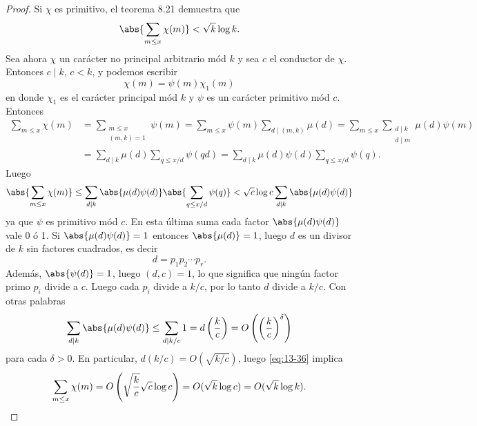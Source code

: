 \documentclass[12pt,a4paper]{book}
\begin{document}
    \begin{proof}
        Si $\chi$ es primitivo, el teorema 8.21 demuestra que
        \begin{equation*}
            \abs{\sum_{m\leq x}\chi(m)}<\sqrt{k}\log k.
        \end{equation*}
        Sea ahora $\chi$ un carácter no principal arbitrario mód $k$ y sea $c$ el conductor de
        $\chi$. Entonces $c\mid k$, $c<k$, y podemos escribir
        \begin{equation*}
            \chi(m)=\psi(m)\chi_{1}(m)
        \end{equation*}
        en donde $\chi_{1}$ es el carácter principal mód $k$ y $\psi$ es un carácter primitivo
        mód $c$. Entonces
        \begin{align*}
            \sum_{m\leq x}\chi(m)&=\sum_{\substack{m\leq x\\(m,k)=1}}\psi(m)=\sum_{m\leq x}\psi(m)\sum_{d\mid(m,k)}\mu(d)=\sum_{m\leq x}\sum_{\substack{d\mid k\\d\mid m}}\mu(d)\psi(m)\\
            &=\sum_{d\mid k}\mu(d)\sum_{q\leq x/d}\psi(qd)=\sum_{d\mid k}\mu(d)\psi(d)\sum_{q\leq x/d}\psi(q).
        \end{align*}
        Luego
        \begin{equation}\label{eq:13-36}
            \abs{\sum_{m\leq x}\chi(m)}\leq\sum_{d\mid k}\abs{\mu(d)\psi(d)}\abs{\sum_{q\leq x/d}\psi(q)}<\sqrt{c}\log c\sum_{d\mid k}\abs{\mu(d)\psi(d)}
        \end{equation}
        ya que $\psi$ es primitivo mód $c$. En esta última suma cada factor
        $\abs{\mu(d)\psi(d)}$ vale 0 ó 1. Si $\abs{\mu(d)\psi(d)}=1$ entonces $\abs{\mu(d)}=1$,
        luego $d$ es un divisor de $k$ sin factores cuadrados, es decir
        \begin{equation*}
            d=p_{1}p_{2}\cdots p_{r}.
        \end{equation*}
        Además, $\abs{\psi(d)}=1$, luego $(d,c)=1$, lo que significa que ningún factor primo
        $p_{i}$ divide a $c$. Luego cada $p_{i}$ divide a $k/c$, por lo tanto $d$ divide a $k/c$. Con
        otras palabras
        \begin{equation*}
            \sum_{d\mid k}\abs{\mu(d)\psi(d)}\leq\sum_{d\mid k/c}1=d\left(\frac{k}{c}\right)=O\left(\left(\frac{k}{c}\right)^{\delta}\right)
        \end{equation*}
        para cada $\delta>0$. En particular, $d(k/c)=O(\sqrt{k/c})$, luego \eqref{eq:13-36}
        implica
        \begin{equation*}
            \sum_{m\leq x}\chi(m)=O\left(\sqrt{\frac{k}{c}}\sqrt{c}\log c\right)=O(\sqrt{k}\log c)=O(\sqrt{k}\log k).\qedhere
        \end{equation*}
    \end{proof}
\end{document}
